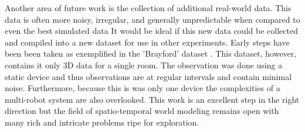     Another area of future work is the collection
    of additional real-world data. This data is often more noisy, irregular,
    and generally unpredictable when compared to even the best simulated data
    It would be ideal if this new data could be collected and compiled into a
    new dataset for use in other experiments. Early steps have been been taken as exemplified in the
    'Brayford' dataset \cite{Krajnik2014}. This dataset, however, contains
    it only 3D data for a single room. The observation was done using a static device and
    thus observations are at regular intervals and contain minimal noise.
    Furthermore, because this is was only one device the complexities of a
    multi-robot system are also overlooked. This work is an excellent step
    in the right direction but the field of spatio-temporal world modeling
    remains open with many rich and intricate problems ripe for exploration. \\


